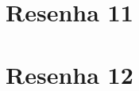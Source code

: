 \documentclass[
	12pt,				%
	openright,			%
	twoside,			%
	a4paper,			%
	english,			%
	brazil,				%
	svgnames
	]{abntex2}\usepackage[]{graphicx}\usepackage[]{color}
\begin{document}
% 


\chapter{Resenha 11}
\label{cap:res11}

% 


\chapter{Resenha 12}
\label{cap:res12}

% 




\postextual


%

% 




\end{document}
